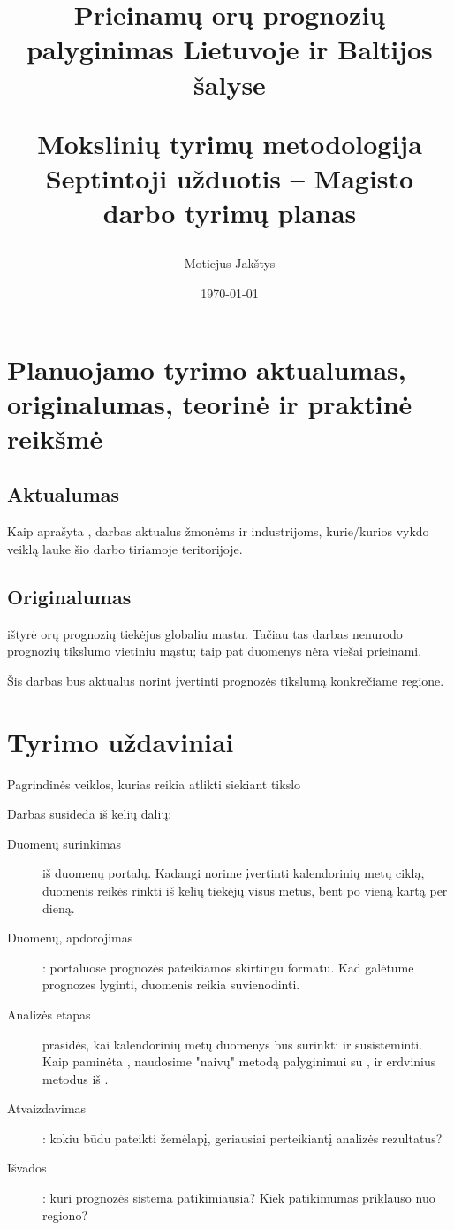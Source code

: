 \documentclass{article}
\title{
    Prieinamų orų prognozių palyginimas Lietuvoje ir Baltijos šalyse \\ \vspace{4mm}

    \large Mokslinių tyrimų metodologija\\
    Septintoji užduotis -- Magisto darbo tyrimų planas
}
\author{Motiejus Jakštys}
\date{\today}
\begin{document}
\maketitle

\newpage

\section{Planuojamo tyrimo aktualumas, originalumas, teorinė ir praktinė reikšmė}

\subsection{Aktualumas}

Kaip aprašyta \cite{motiejus-task6}, darbas aktualus žmonėms ir industrijoms,
kurie/kurios vykdo veiklą lauke šio darbo tiriamoje teritorijoje.

\subsection{Originalumas}

\cite{rose2017analysis} ištyrė orų prognozių tiekėjus globaliu mastu. Tačiau tas darbas
nenurodo prognozių tikslumo vietiniu mąstu; taip pat duomenys nėra viešai prieinami.

Šis darbas bus aktualus norint įvertinti prognozės tikslumą konkrečiame regione.

\section{Tyrimo uždaviniai}
{\small Pagrindinės veiklos, kurias reikia atlikti siekiant tikslo}

Darbas susideda iš kelių dalių:
\begin{description}
    \item[Duomenų surinkimas] iš duomenų portalų. Kadangi norime įvertinti
        kalendorinių metų ciklą, duomenis reikės rinkti iš kelių tiekėjų visus
        metus, bent po vieną kartą per dieną.
    \item[Duomenų, apdorojimas]: portaluose prognozės pateikiamos skirtingu
        formatu. Kad galėtume prognozes lyginti, duomenis reikia suvienodinti.
    \item[Analizės etapas] prasidės, kai kalendorinių metų duomenys bus surinkti
        ir susisteminti. Kaip paminėta \cite{motiejus-task6}, naudosime "naivų"
        metodą palyginimui su \cite{rose2017analysis}, ir erdvinius metodus iš
        \cite{verification2015}.
    \item[Atvaizdavimas]: kokiu būdu pateikti žemėlapį, geriausiai perteikiantį
        analizės rezultatus?
    \item[Išvados]: kuri prognozės sistema patikimiausia? Kiek patikimumas
        priklauso nuo regiono?
\end{description}
\end{document}
